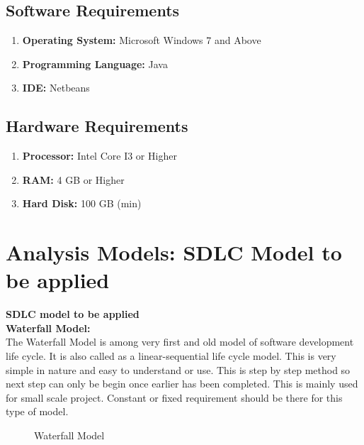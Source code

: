 \documentclass[oneside,a4paper,12pt]{report}
\begin{document}
\subsection{Software Requirements}
\begin{enumerate}
\item \textbf{Operating System: } Microsoft Windows 7 and Above
\item \textbf{Programming Language: } Java
\item \textbf{IDE: } Netbeans
\end{enumerate}
\subsection{Hardware Requirements}
\begin{enumerate}
\item \textbf{Processor: } Intel Core I3 or Higher
\item \textbf{RAM: } 4 GB or Higher
\item \textbf{Hard Disk: } 100 GB (min)
\end{enumerate}

\section{Analysis Models: SDLC Model to be applied}
\textbf{SDLC model to be applied}\\
\textbf{Waterfall Model:}\\
\hspace*{0.5cm} The Waterfall Model is among very first and old model of software development life cycle. It is also called as a linear-sequential life cycle model. This is very simple in nature and easy to understand or use. This is step by step method so next step can only be begin once earlier has been completed. This is mainly used for small scale project. Constant or fixed requirement should be there for this type of model. 

\begin{center}
	\begin{figure}[!htbp]
		\centering
	    \caption{Waterfall Model}
	    \label{fig:Waterfall Model}
	\end{figure}
\end{center}
\end{document}
